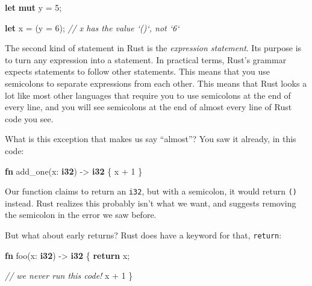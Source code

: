\documentclass[a4paper,]{book}
\newenvironment{Shaded}{\begin{snugshade}}{\end{snugshade}}
\newcommand{\KeywordTok}[1]{\textcolor[rgb]{0.13,0.29,0.53}{\textbf{{#1}}}}
\newcommand{\DecValTok}[1]{\textcolor[rgb]{0.00,0.00,0.81}{{#1}}}
\newcommand{\CommentTok}[1]{\textcolor[rgb]{0.56,0.35,0.01}{\textit{{#1}}}}
\newcommand{\NormalTok}[1]{{#1}}
\begin{document}
\begin{Shaded}
\begin{Highlighting}[]
\KeywordTok{let} \KeywordTok{mut} \NormalTok{y = }\DecValTok{5}\NormalTok{;}

\KeywordTok{let} \NormalTok{x = (y = }\DecValTok{6}\NormalTok{);  }\CommentTok{// x has the value `()`, not `6`}
\end{Highlighting}
\end{Shaded}

The second kind of statement in Rust is the \emph{expression statement}.
Its purpose is to turn any expression into a statement. In practical
terms, Rust's grammar expects statements to follow other statements.
This means that you use semicolons to separate expressions from each
other. This means that Rust looks a lot like most other languages that
require you to use semicolons at the end of every line, and you will see
semicolons at the end of almost every line of Rust code you see.

What is this exception that makes us say ``almost''? You saw it already,
in this code:

\begin{Shaded}
\begin{Highlighting}[]
\KeywordTok{fn} \NormalTok{add_one(x: }\KeywordTok{i32}\NormalTok{) -> }\KeywordTok{i32} \NormalTok{\{}
    \NormalTok{x + }\DecValTok{1}
\NormalTok{\}}
\end{Highlighting}
\end{Shaded}

Our function claims to return an \texttt{i32}, but with a semicolon, it
would return \texttt{()} instead. Rust realizes this probably isn't what
we want, and suggests removing the semicolon in the error we saw before.


But what about early returns? Rust does have a keyword for that,
\texttt{return}:

\begin{Shaded}
\begin{Highlighting}[]
\KeywordTok{fn} \NormalTok{foo(x: }\KeywordTok{i32}\NormalTok{) -> }\KeywordTok{i32} \NormalTok{\{}
    \KeywordTok{return} \NormalTok{x;}

    \CommentTok{// we never run this code!}
    \NormalTok{x + }\DecValTok{1}
\NormalTok{\}}
\end{Highlighting}
\end{Shaded}
\end{document}
